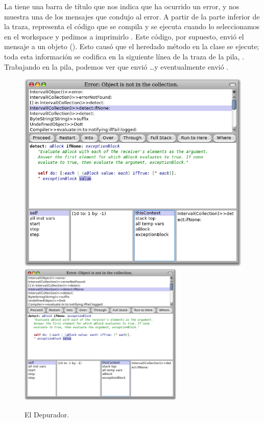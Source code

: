 \documentclass[spanish,a4paper,10pt,twoside]{book}
\begin{document}
La  tiene una barra de t\'itulo que nos indica que ha ocurrido un error, y nos muestra una  de los mensajes que condujo al error.
A partir de la parte inferior de la traza,  representa el c\'odigo que se compila y se ejecuta cuando lo seleccionamos  en el workspace y pedimos a \pharo imprimirlo .
Este c\'odigo, por supuesto, envi\'o el mensaje  a un objeto  ().
Esto caus\'o que el heredado m\'etodo  en la clase  se ejecute; toda esta informaci\'on se codifica en la siguiente l\'inea de la traza de la pila, .
Trabajando en la pila, podemos ver que  envi\'o \ldots y eventualmente  envi\'o .

\begin{figure}[btp]
	\begin{center}
	\ifluluelse
		{\includegraphics[width=\textwidth]{debuggerDetectIfNone}}
		{\includegraphics[width=0.7\textwidth]{debuggerDetectIfNone}}
	\end{center}
	\caption{El Depurador.}
\end{figure}
\end{document}
